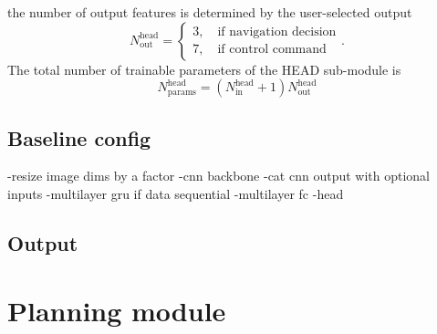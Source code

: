 the number of output features is determined by 
the user-selected output
\begin{equation}
    N^\text{head}_\text{out}
    = 
    \begin{cases}
        3
        ,\quad 
        \text{if navigation decision} 
        \\
        7
        ,\quad 
        \text{if control command} 
    \end{cases}.
\end{equation}
The total number of trainable parameters of the HEAD sub-module is
\begin{equation}
    N^\text{head}_\text{params} 
    = 
    \left(
        N^\text{head}_\text{in} + 1
    \right)
    N^\text{head}_\text{out}
\end{equation}


\subsection{Baseline config}



%


-resize image dims by a factor
-cnn backbone
-cat cnn output with optional inputs
-multilayer gru if data sequential
-multilayer fc
-head




\subsection*{Output}










\section{Planning module}




